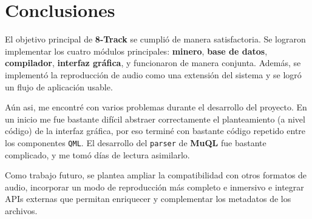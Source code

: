 \section{Conclusiones}

El objetivo principal de \textbf{8-Track} se cumplió de manera satisfactoria. Se lograron implementar los cuatro
módulos principales: \textbf{minero}, \textbf{base de datos}, \textbf{compilador}, \textbf{interfaz gráfica}, y
funcionaron de manera conjunta. Además, se implementó la reproducción de audio como una extensión del sistema
y se logró un flujo de aplicación usable.

Aún asi, me encontré con varios problemas durante el desarrollo del proyecto. En un inicio me fue bastante difícil
abstraer correctamente el planteamiento (a nivel código) de la interfaz gráfica, por eso terminé con bastante código
repetido entre los componentes \texttt{QML}. El desarrollo del \texttt{parser} de \textbf{MuQL} fue bastante complicado,
y me tomó días de lectura asimilarlo.

Como trabajo futuro, se plantea ampliar la compatibilidad con otros formatos de audio, incorporar un modo de reproducción
más completo e inmersivo e integrar APIs externas que permitan enriquecer y complementar los metadatos de los archivos.
